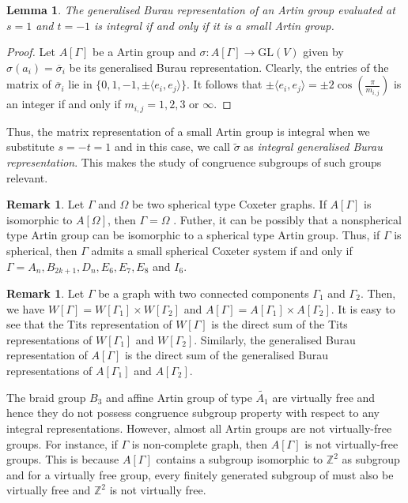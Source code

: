 \documentclass[12pt]{amsart}
\newtheorem{lemma}[equation]{Lemma}
\theoremstyle{definition}
\newtheorem{remark}[equation]{Remark}
\numberwithin{equation}{section}
\newcommand{\GL}{\mathrm{GL}}
\begin{document}
\begin{lemma}\label{tits rep integral small}
The generalised Burau representation of an Artin group evaluated at $s=1$ and $t=-1$ is integral if and only if it is a small Artin group.
\end{lemma}
\begin{proof}
Let $A[\Gamma]$ be a Artin group and $\sigma: A[\Gamma] \rightarrow \GL(V)$ given by $\sigma(a_i)=\overline{\sigma}_i$ be its generalised Burau representation. Clearly, the entries of the matrix of $\overline{\sigma}_i$ lie in $\{0, 1, -1, \pm\langle e_i,e_j\rangle \}$. It follows that $\pm\langle e_i,e_j\rangle = \pm 2  \cos(\frac{\pi}{m_{i,j}})$ is an integer if and only if  $m_{i,j}= 1,2,3$ or ${\infty}$.
\end{proof}
Thus, the matrix representation of a small Artin group is integral when we substitute $s=-t=1$ and in this case, we call $\tilde{\sigma}$ as {\it integral generalised Burau representation}. This makes the study of congruence subgroups of such groups relevant.
\begin{remark}
 Let $\Gamma$ and $\Omega$ be two spherical type Coxeter graphs. If $A[\Gamma]$ is isomorphic to $A[\Omega]$, then $\Gamma = \Omega$ \cite[Theorem 1.1]{MR2098788}. Futher, it can be possibly that a nonspherical type Artin group can be isomorphic to a spherical type Artin group. Thus, if $\Gamma$ is spherical, then $\Gamma$ admits a small spherical Coxeter system if and only if $\Gamma=A_n,B_{2k+1}, D_n, E_6, E_7, E_8$ and $I_6$.
 \end{remark}

\begin{remark}\label{rmk:direct}
 Let $\Gamma$ be a graph with two connected components $\Gamma_1$ and $\Gamma_2$. Then, we have $W[\Gamma]=W[\Gamma_1]\times W[\Gamma_2]$ and $A[\Gamma]=A[\Gamma_1]\times A[\Gamma_2]$. It is easy to see that the Tits representation of $W[\Gamma]$ is the direct sum of the Tits representations of $W[\Gamma_1]$ and $W[\Gamma_2]$. Similarly, the generalised Burau representation of $A[\Gamma]$ is the direct sum of the generalised Burau representations of $A[\Gamma_1]$ and $A[\Gamma_2]$.
\end{remark}


The braid group $B_3$ and affine Artin group of type $\tilde{A_1}$ are virtually free and hence they do not possess congruence subgroup property with respect to any integral representations. However, almost all Artin groups are not virtually-free groups. For instance, if $\Gamma$ is non-complete graph,  then $A[\Gamma]$ is not virtually-free groups. This is because $ A[\Gamma]$ contains a subgroup isomorphic to  $\mathbb{Z}^2$ as subgroup and for a virtually free group, every finitely generated subgroup of must also be virtually free and $\mathbb{Z}^2$ is not virtually free.
\end{document}
